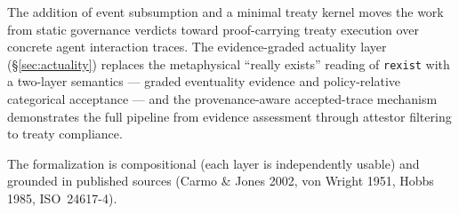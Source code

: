 \documentclass[]{article}
\newcommand{\code}[1]{\texttt{#1}}
\begin{document}
The addition of event subsumption and a minimal treaty kernel moves the work
from static governance verdicts toward proof-carrying treaty execution over
concrete agent interaction traces.  The evidence-graded actuality layer
(§\ref{sec:actuality}) replaces the metaphysical ``really exists'' reading
of \code{rexist} with a two-layer semantics --- graded eventuality
evidence and policy-relative categorical acceptance --- and the
provenance-aware accepted-trace mechanism demonstrates the full pipeline
from evidence assessment through attestor filtering to treaty compliance.

The formalization is compositional (each layer is independently usable)
and grounded in published sources (Carmo \& Jones 2002, von Wright 1951,
Hobbs 1985, ISO~24617-4).



\end{document}
